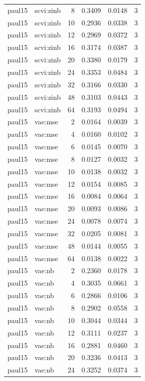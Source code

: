 \begin{tabular}{llrrrr}
paul15 & scvi:zinb & 8 & 0.3409 & 0.0148 & 3 \\
paul15 & scvi:zinb & 10 & 0.2936 & 0.0338 & 3 \\
paul15 & scvi:zinb & 12 & 0.2969 & 0.0372 & 3 \\
paul15 & scvi:zinb & 16 & 0.3174 & 0.0387 & 3 \\
paul15 & scvi:zinb & 20 & 0.3380 & 0.0179 & 3 \\
paul15 & scvi:zinb & 24 & 0.3353 & 0.0484 & 3 \\
paul15 & scvi:zinb & 32 & 0.3166 & 0.0330 & 3 \\
paul15 & scvi:zinb & 48 & 0.3103 & 0.0443 & 3 \\
paul15 & scvi:zinb & 64 & 0.3193 & 0.0494 & 3 \\
paul15 & vae:mse & 2 & 0.0164 & 0.0039 & 3 \\
paul15 & vae:mse & 4 & 0.0160 & 0.0102 & 3 \\
paul15 & vae:mse & 6 & 0.0145 & 0.0070 & 3 \\
paul15 & vae:mse & 8 & 0.0127 & 0.0032 & 3 \\
paul15 & vae:mse & 10 & 0.0138 & 0.0032 & 3 \\
paul15 & vae:mse & 12 & 0.0154 & 0.0085 & 3 \\
paul15 & vae:mse & 16 & 0.0084 & 0.0064 & 3 \\
paul15 & vae:mse & 20 & 0.0093 & 0.0086 & 3 \\
paul15 & vae:mse & 24 & 0.0078 & 0.0074 & 3 \\
paul15 & vae:mse & 32 & 0.0205 & 0.0081 & 3 \\
paul15 & vae:mse & 48 & 0.0144 & 0.0055 & 3 \\
paul15 & vae:mse & 64 & 0.0138 & 0.0022 & 3 \\
paul15 & vae:nb & 2 & 0.2360 & 0.0178 & 3 \\
paul15 & vae:nb & 4 & 0.3035 & 0.0661 & 3 \\
paul15 & vae:nb & 6 & 0.2866 & 0.0106 & 3 \\
paul15 & vae:nb & 8 & 0.2902 & 0.0558 & 3 \\
paul15 & vae:nb & 10 & 0.3044 & 0.0344 & 3 \\
paul15 & vae:nb & 12 & 0.3111 & 0.0237 & 3 \\
paul15 & vae:nb & 16 & 0.2881 & 0.0460 & 3 \\
paul15 & vae:nb & 20 & 0.3236 & 0.0413 & 3 \\
paul15 & vae:nb & 24 & 0.3252 & 0.0374 & 3 \\

\end{tabular}
